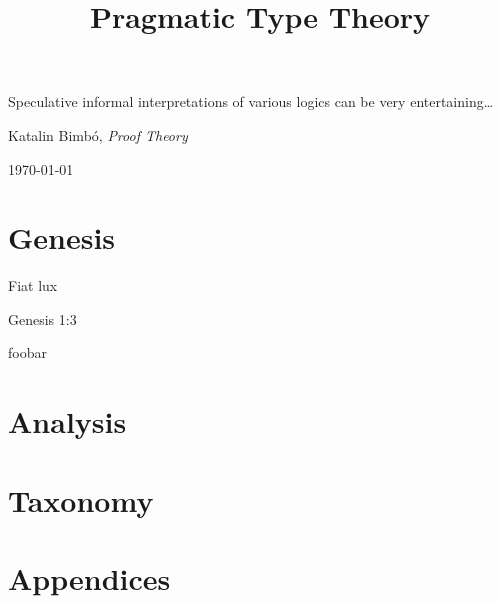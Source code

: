 \documentclass[12pt,book]{memoir}
\begin{document}
\title{Pragmatic Type Theory}
\date{}
\titlingpageend{\clearpage}{\clearpage}
\begin{titlingpage}
  \maketitle
\epigraph{Speculative informal interpretations of various logics can be very entertaining\ldots}{Katalin Bimbó, \textit{Proof Theory} \parencite{bimbo2014proof}}
\end{titlingpage}

\today
\newpage

\hypertarget{toc}{}
\tableofcontents*

\mainmatter

\nopartblankpage
\makeatletter
\renewcommand*{\afterpartskip}{\par\vskip2ex
\@afterindentfalse} %
\makeatother

\part{Genesis}
\epigraph{Fiat lux}
         {Genesis 1:3}
\newpage
foobar



\part{Analysis}


\part{Taxonomy}


\part{Appendices}
\appendix









\end{document}
